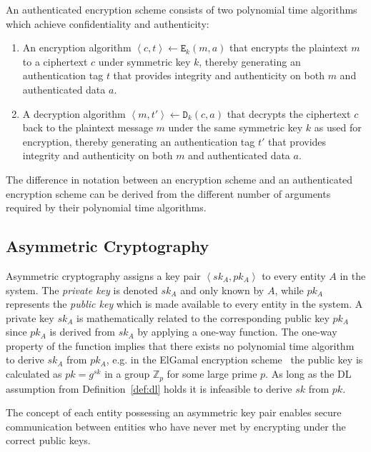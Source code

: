 \begin{defn}
\label{def:authenticated_encryption}
 An authenticated encryption scheme consists of two polynomial time algorithms which achieve confidentiality and authenticity:
 \begin{enumerate}
   \item An encryption algorithm $\left< c,t \right> \leftarrow \mathtt{E}_k \left( m, a\right)$ that encrypts the plaintext $m$ to a ciphertext $c$ under symmetric key $k$, thereby generating an authentication tag $t$ that provides integrity and authenticity on both $m$ and authenticated data $a$.
   \item A decryption algorithm $\left< m,t' \right> \leftarrow \mathtt{D}_k \left( c,a \right)$ that decrypts the ciphertext $c$ back to the plaintext message $m$ under the same symmetric key $k$ as used for encryption, thereby generating an authentication tag $t'$ that provides integrity and authenticity on both $m$ and authenticated data $a$.
 \end{enumerate}
\end{defn}

The difference in notation between an encryption scheme and an authenticated encryption scheme can be derived from the different number of arguments required by their polynomial time algorithms.

\subsection{Asymmetric Cryptography}
Asymmetric cryptography assigns a key pair $\left< sk_A, pk_A \right>$ to every entity $A$ in the system. The \textit{private key} is denoted $sk_A$ and only known by $A$, while $pk_A$ represents the \textit{public key} which is made available to every entity in the system. A private key $sk_A$ is mathematically related to the corresponding public key $pk_A$ since $pk_A$ is derived from $sk_A$ by applying a one-way function. The one-way property of the function implies that there exists no polynomial time algorithm to derive $sk_A$ from $pk_A$, e.g. in the ElGamal encryption scheme~\cite{art:Elgamal85} the public key is calculated as $pk = g^{sk}$ in a group $\mathbb{Z}_p$ for some large prime $p$. As long as the DL assumption from Definition~\ref{def:dl} holds it is infeasible to derive $sk$ from $pk$.

The concept of each entity possessing an asymmetric key pair enables secure communication between entities who have never met by encrypting under the correct public keys.


